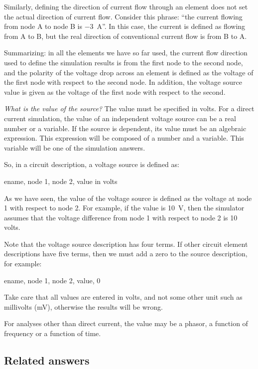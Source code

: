 Similarly, defining the direction of current flow through an element
does not set the actual direction of current flow. Consider this
phrase: ``the current flowing from node A to node B is $-3$~A''. In
this case, the current is defined as flowing from A to B, but the
real direction of conventional current flow is from B to A.

Summarizing: in all the elements we have so far used, the current
flow direction used to define the simulation results is from the
first node to the second node, and the polarity of the voltage drop
across an element is defined as the voltage of the first node with
respect to the second node. In addition, the voltage source value is
given as the voltage of the first node with respect to the second.

\emph{What is the value of the source?} The value must be specified
in volts. For a direct current simulation, the value of an
independent voltage source can be a real number or a variable. If
the source is dependent, its value must be an algebraic expression.
This expression will be composed of a number and a variable. This
variable will be one of the simulation answers.

So, in a circuit description, a voltage source is defined as:

\begin{entry}
ename, node 1, node 2, value in volts
\end{entry}

As we have seen, the value of the voltage source is defined as the
voltage at node 1 with respect to node 2. For example, if the value
is 10~V, then the simulator assumes that the voltage difference from
node 1 with respect to node 2 is 10 volts.

Note that the voltage source description has four terms. If other
circuit element descriptions have five terms, then we must add a
zero to the source description, for example:

\begin{entry}
ename, node 1, node 2, value, 0
\end{entry}

Take care that all values are entered in volts, and not some other
unit such as millivolts (mV), otherwise the results will be wrong.

For analyses other than direct current, the value may be a phasor, a
function of frequency or a function of time.

\subsection{Related answers}

